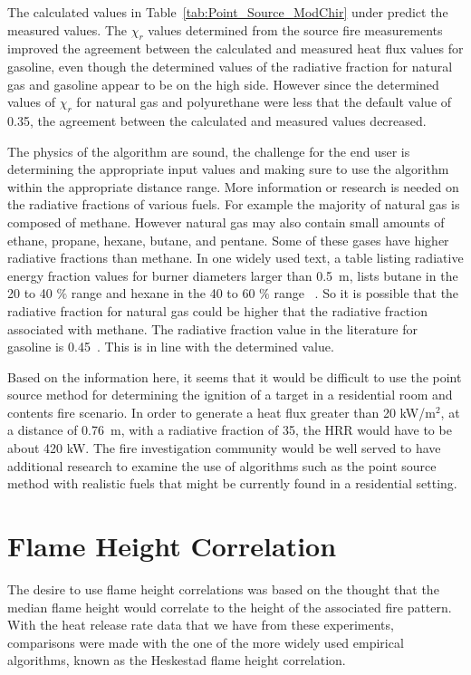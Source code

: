 \documentclass[twoside]{uocthesis}
\begin{document}
{The calculated values in Table~\ref{tab:Point_Source_ModChir} under predict the measured values.  The $\chi_r$ values determined from the source fire measurements improved the agreement between the calculated and measured heat flux values for gasoline, even though the determined values of the radiative fraction for natural gas and gasoline appear to be on the high side. However since the determined values of $\chi_r$ for natural gas and polyurethane were less that the default value of 0.35, the agreement between the calculated and measured values decreased.  

The physics of the algorithm are sound, the challenge for the end user is determining the appropriate input values and making sure to use the algorithm within the appropriate distance range.  More information or research is needed on the radiative fractions of various fuels.  For example the majority of natural gas is composed of methane.  However natural gas may also contain small amounts of ethane, propane, hexane, butane, and pentane. Some of these gases have higher radiative fractions than methane. In one widely used text, a table listing radiative energy fraction values for burner diameters larger than 0.5~m, lists butane in the 20 to 40 $\%$ range and hexane in the 40 to 60 $\%$ range ~\cite{Quintiere:1997}.  So it is possible that the radiative fraction for natural gas could be higher that the radiative fraction associated with methane.  The radiative fraction value in the literature for gasoline is 0.45~\cite{Quintiere:1997, IAAI:2017}.  This is in line with the determined value.

Based on the information here, it seems that it would be difficult to use the point source method for determining the ignition of a target in a residential room and contents fire scenario.  In order to generate a heat flux greater than 20 kW/m$^2$, at a distance of 0.76~m, with a radiative fraction of 35, the HRR would have to be about 420 kW.
The fire investigation community would be well served to have additional research to examine the use of algorithms such as the point source method with realistic fuels that might be currently found in a residential setting.

\section{Flame Height Correlation}

The desire to use flame height correlations was based on the thought that the median flame height would correlate to the height of the associated fire pattern.  With the heat release rate data that we have from these experiments, comparisons were made with the one of the more widely used empirical algorithms, known as the Heskestad flame height correlation.  

}
\end{document}

